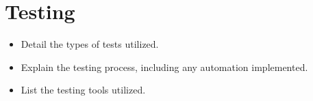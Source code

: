 \section{Testing}
\begin{itemize}
   \item Detail the types of tests utilized.
   \item  Explain the testing process, including any automation implemented.
   \item List the testing tools utilized.
\end{itemize}